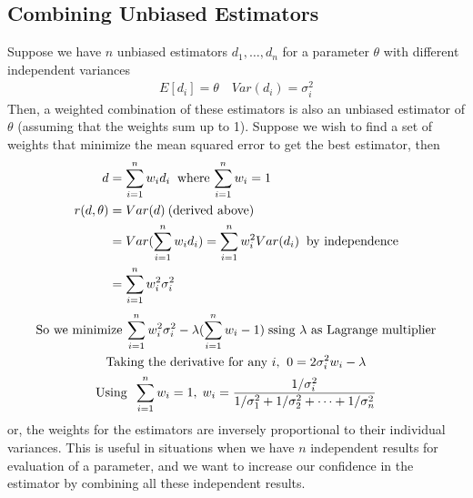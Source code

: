 \documentclass[../probability-notes.tex]{subfiles}
\begin{document}
    \subsection{Combining Unbiased Estimators}
    Suppose we have $n$ unbiased estimators $d_{1}, \ldots, d_{n}$ for a parameter $\theta$ with different independent variances
    \begin{align*}
        E[d_{i}] = \theta \quad Var(d_{i}) = \sigma_{i}^{2}
    \end{align*}
    Then, a weighted combination of these estimators is also an unbiased estimator of $\theta$ (assuming that the weights sum up to 1). Suppose we wish to find a set of weights that minimize the mean squared error to get the best estimator, then
    \begin{align*}
        d &= \sum_{i=1}^{n} w_{i} d_{i} \text{\: where $\sum_{i=1}^{n} w_{i} = 1$}\\
        r(d, \theta) &= Var(d) \text{\:(derived above)}\\
        &= Var(\sum_{i=1}^{n} w_{i} d_{i})
        = \sum_{i=1}^{n} w_{i}^{2} Var(d_{i}) \text{\: by independence}\\
        &= \sum_{i=1}^{n} w_{i}^{2} \sigma_{i}^{2}
    \end{align*}
    \begin{gather*}
        \text{So we minimize\:} \sum_{i=1}^{n} w_{i}^{2} \sigma_{i}^{2} - \lambda(\sum_{i=1}^{n} w_{i}-1) \; \text{ssing $\lambda$ as Lagrange multiplier}\\
        \text{Taking the derivative for any $i$, \:} 0 = 2\sigma_{i}^{2} w_{i} - \lambda \\
        \text{Using \:}\sum_{i=1}^{n} w_{i} = 1, \;
        w_{i} = \frac{1/\sigma_{i}^{2}}{1/\sigma_{1}^{2} + 1/\sigma_{2}^{2} + \cdots + 1/\sigma_{n}^{2}}
    \end{gather*}
    or, the weights for the estimators are inversely proportional to their individual variances. This is useful in situations when we have $n$ independent results for evaluation of a parameter, and we want to increase our confidence in the estimator by combining all these independent results.\newline


\end{document}
